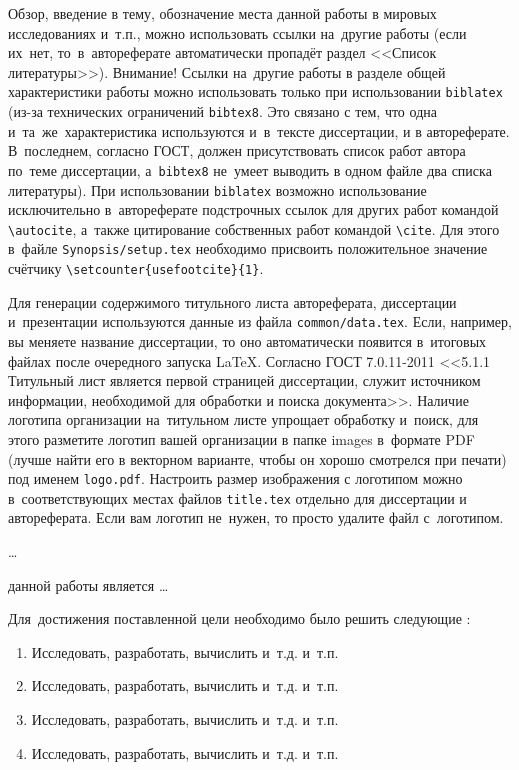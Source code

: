 
{\actuality} Обзор, введение в тему, обозначение места данной работы в
мировых исследованиях и~т.\:п., можно использовать ссылки на~другие
работы
(если их~нет, то~в~автореферате
автоматически пропадёт раздел <<Список литературы>>). Внимание! Ссылки
на~другие работы в разделе общей характеристики работы можно
использовать только при использовании \verb!biblatex! (из-за технических
ограничений \verb!bibtex8!. Это связано с тем, что одна
и~та~же~характеристика используются и~в~тексте диссертации, и в
автореферате. В~последнем, согласно ГОСТ, должен присутствовать список
работ автора по~теме диссертации, а~\verb!bibtex8! не~умеет выводить в одном
файле два списка литературы).
При использовании \verb!biblatex! возможно использование исключительно
в~автореферате подстрочных ссылок
для других работ командой \verb!\autocite!, а~также цитирование
собственных работ командой \verb!\cite!. Для этого в~файле
\verb!Synopsis/setup.tex! необходимо присвоить положительное значение
счётчику \verb!\setcounter{usefootcite}{1}!.

Для генерации содержимого титульного листа автореферата, диссертации
и~презентации используются данные из файла \verb!common/data.tex!. Если,
например, вы меняете название диссертации, то оно автоматически
появится в~итоговых файлах после очередного запуска \LaTeX. Согласно
ГОСТ 7.0.11-2011 <<5.1.1 Титульный лист является первой страницей
диссертации, служит источником информации, необходимой для обработки и
поиска документа>>. Наличие логотипа организации на~титульном листе
упрощает обработку и~поиск, для этого разметите логотип вашей
организации в папке images в~формате PDF (лучше найти его в векторном
варианте, чтобы он хорошо смотрелся при печати) под именем
\verb!logo.pdf!. Настроить размер изображения с логотипом можно
в~соответствующих местах файлов \verb!title.tex!  отдельно для
диссертации и автореферата. Если вам логотип не~нужен, то просто
удалите файл с~логотипом.

{\progress} \ldots

{\aim} данной работы является \ldots

Для~достижения поставленной цели необходимо было решить следующие {\tasks}:
\begin{enumerate}
  \item Исследовать, разработать, вычислить и~т.\:д. и~т.\:п.
  \item Исследовать, разработать, вычислить и~т.\:д. и~т.\:п.
  \item Исследовать, разработать, вычислить и~т.\:д. и~т.\:п.
  \item Исследовать, разработать, вычислить и~т.\:д. и~т.\:п.
\end{enumerate}


